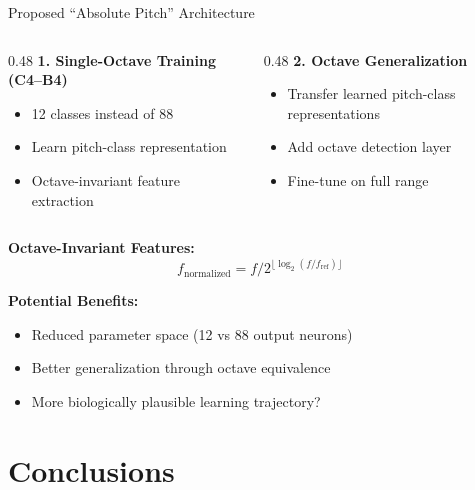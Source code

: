 \documentclass[aspectratio=169,20pt]{beamer}
\begin{document}
\begin{frame}{Proposed ``Absolute Pitch'' Architecture}
\begin{columns}
	\centering
	\begin{column}{0.48\textwidth}
		\textbf{1. Single-Octave Training (C4--B4)}
		\begin{itemize}
			\item 12 classes instead of 88
			\item Learn pitch-class representation
			\item Octave-invariant feature extraction
		\end{itemize}
	\end{column}
	\begin{column}{0.48\textwidth}
		\textbf{2. Octave Generalization}
		\begin{itemize}
			\item Transfer learned pitch-class representations
			\item Add octave detection layer
			\item Fine-tune on full range
		\end{itemize}
	\end{column}
\end{columns}




\vspace{0.3cm}
\textbf{Octave-Invariant Features:}
\begin{equation}
f_{\text{normalized}} = f / 2^{\lfloor\log_2(f/f_{\text{ref}})\rfloor}
\end{equation}

\vspace{0.2cm}
\textbf{Potential Benefits:}
\begin{itemize}
    \item Reduced parameter space (12 vs 88 output neurons)
    \item Better generalization through octave equivalence
    \item More biologically plausible learning trajectory?
\end{itemize}
\end{frame}

\section{Conclusions}
\end{document}
